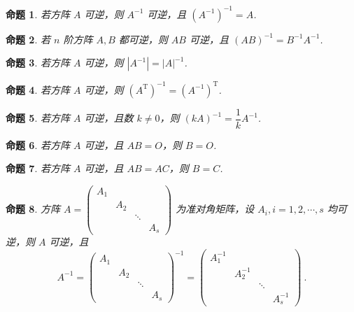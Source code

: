 \documentclass[zihao=-4,UTF8,linespread=1.8,nothm]{aytony_base}
\newtheorem*{proposition*}{\indent 命题}
\begin{document}
\begin{proposition*}
    若方阵 $A$ 可逆，则 $A^{-1}$ 可逆，且 $(A^{-1})^{-1} = A$.
\end{proposition*}

\begin{proposition*}
    若 $n$ 阶方阵 $A, B$ 都可逆，则 $AB$ 可逆，且 $(AB)^{-1} = B^{-1}A^{-1}$.
\end{proposition*}

\begin{proposition*}
    若方阵 $A$ 可逆，则 $\left|A^{-1}\right| = |A|^{-1}$.
\end{proposition*}

\begin{proposition*}
    若方阵 $A$ 可逆，则 $(A ^{\mathrm{T}})^{-1} = (A^{-1})^{\mathrm{T}}$.
\end{proposition*}

\begin{proposition*}
    若方阵 $A$ 可逆，且数 $k \neq 0$，则 $(kA)^{-1} = \dfrac{1}{k}A^{-1}$.
\end{proposition*}

\begin{proposition*}
    若方阵 $A$ 可逆，且 $AB = O$，则 $B = O$.
\end{proposition*}

\begin{proposition*}
    若方阵 $A$ 可逆，且 $AB = AC$，则 $B = C$.
\end{proposition*}

\begin{proposition*}
    方阵 $A = \left(
        \begin{matrix}
                A_1 &     &        &     \\
                    & A_2 &        &     \\
                    &     & \ddots &     \\
                    &     &        & A_s
            \end{matrix}
        \right)$ 为准对角矩阵，设 $A_i, i = 1, 2, \cdots, s$ 均可逆，则 $A$ 可逆，且 $$
        A^{-1} = \left(
        \begin{matrix}
            A_1 &     &        &     \\
                & A_2 &        &     \\
                &     & \ddots &     \\
                &     &        & A_s
        \end{matrix}
        \right)^{-1} =
        \left(
        \begin{matrix}
                A_1^{-1} &          &        &          \\
                         & A_2^{-1} &        &          \\
                         &          & \ddots &          \\
                         &          &        & A_s^{-1}
            \end{matrix}
        \right)\ .
    $$
\end{proposition*}
\end{document}
